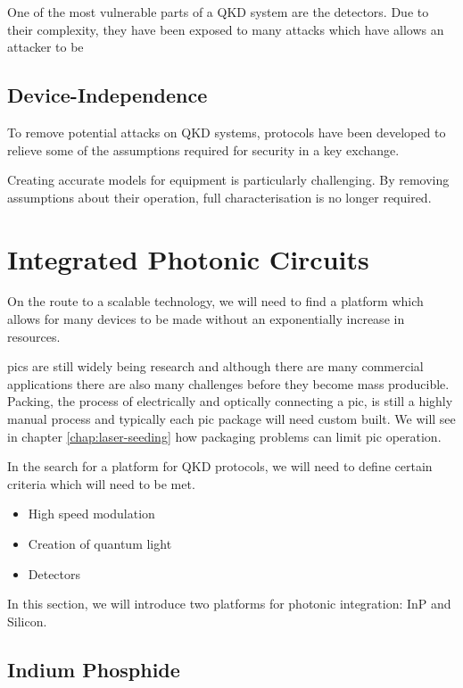 One of the most vulnerable parts of a \ac{QKD} system are the detectors. Due to their complexity, they have been exposed to many attacks which have allows an attacker to be 

\subsection{Device-Independence}

To remove potential attacks on \ac{QKD} systems, protocols have been developed to relieve some of the assumptions required for security in a key exchange. 

Creating accurate models for equipment is particularly challenging. By removing assumptions about their operation, full characterisation is no longer required.

\section{Integrated Photonic Circuits}

On the route to a scalable technology, we will need to find a platform which allows for many devices to be made without an exponentially increase in resources. 

\Acp{pic} are still widely being research and although there are many commercial applications there are also many challenges before they become mass producible. Packing, the process of electrically and optically connecting a \ac{pic}, is still a highly manual process and typically each \ac{pic} package will need custom built. We will see in chapter \ref{chap:laser-seeding} how packaging problems can limit \ac{pic} operation.

In the search for a platform for \ac{QKD} protocols, we will need to define certain criteria which will need to be met.

\begin{itemize}
	\item High speed modulation
	\item Creation of quantum light
	\item Detectors
\end{itemize}

In this section, we will introduce two platforms for photonic integration: \Ac{InP} and Silicon.

\subsection{Indium Phosphide}

